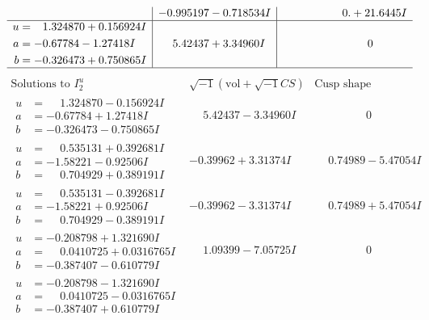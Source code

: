 \documentclass[1p]{elsarticle_modified}
\theoremstyle{definition}
\newcommand{\I}{\sqrt{-1}}
\begin{document}
$$\begin{array}{c|c|c}
 & -0.995197 - 0.718534 I & \phantom{-0.000000 -}0. + 21.6445 I \\ \hline\begin{aligned}
u &= \phantom{-}1.324870 + 0.156924 I \\
a &= -0.67784 - 1.27418 I \\
b &= -0.326473 + 0.750865 I\end{aligned}
 & \phantom{-}5.42437 + 3.34960 I & \phantom{-0.000000 } 0\\
 \hline 
 \end{array}$$\newpage$$\begin{array}{c|c|c}  
\text{Solutions to }I^u_{2}& \I (\text{vol} + \sqrt{-1}CS) & \text{Cusp shape}\\
 \hline 
\begin{aligned}
u &= \phantom{-}1.324870 - 0.156924 I \\
a &= -0.67784 + 1.27418 I \\
b &= -0.326473 - 0.750865 I\end{aligned}
 & \phantom{-}5.42437 - 3.34960 I & \phantom{-0.000000 } 0 \\ \hline\begin{aligned}
u &= \phantom{-}0.535131 + 0.392681 I \\
a &= -1.58221 - 0.92506 I \\
b &= \phantom{-}0.704929 + 0.389191 I\end{aligned}
 & -0.39962 + 3.31374 I & \phantom{-}0.74989 - 5.47054 I \\ \hline\begin{aligned}
u &= \phantom{-}0.535131 - 0.392681 I \\
a &= -1.58221 + 0.92506 I \\
b &= \phantom{-}0.704929 - 0.389191 I\end{aligned}
 & -0.39962 - 3.31374 I & \phantom{-}0.74989 + 5.47054 I \\ \hline\begin{aligned}
u &= -0.208798 + 1.321690 I \\
a &= \phantom{-}0.0410725 + 0.0316765 I \\
b &= -0.387407 - 0.610779 I\end{aligned}
 & \phantom{-}1.09399 - 7.05725 I & \phantom{-0.000000 } 0 \\ \hline\begin{aligned}
u &= -0.208798 - 1.321690 I \\
a &= \phantom{-}0.0410725 - 0.0316765 I \\
b &= -0.387407 + 0.610779 I\end{aligned}

\end{array}$$
\end{document}
